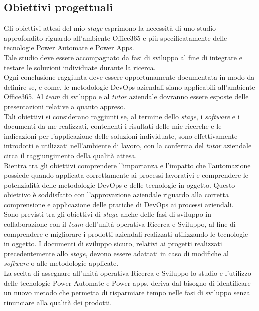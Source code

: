 \subsection{Obiettivi progettuali}
Gli obiettivi attesi del mio \emph{stage} esprimono la necessità di uno studio approfondito riguardo all'ambiente Office365 e più specificatamente delle tecnologie Power Automate e Power Apps.\\
Tale studio deve essere accompagnato da fasi di sviluppo al fine di integrare e testare le soluzioni individuate durante la ricerca.\\
Ogni conclusione raggiunta deve essere opportunamente documentata in modo da definire se, e come, le metodologie \gls{DevOps} aziendali siano applicabili all'ambiente Office365. Al \emph{team} di sviluppo e al \emph{tutor} aziendale dovranno essere esposte delle presentazioni relative a quanto appreso.\\
Tali obiettivi si considerano raggiunti se, al termine dello \emph{stage}, i \emph{software} e i documenti da me realizzati, contenenti i risultati delle mie ricerche e le indicazioni per l'applicazione delle soluzioni individuate, sono effettivamente introdotti e utilizzati nell'ambiente di lavoro, con la conferma del \emph{tutor} aziendale circa il raggiungimento della qualità attesa.\\
Rientra tra gli obiettivi comprendere l'importanza e l'impatto che l'automazione possiede quando applicata correttamente ai processi lavorativi e comprendere le potenzialità delle metodologie \gls{DevOps} e delle tecnologie in oggetto. Questo obiettivo è soddisfatto con l'approvazione aziendale riguardo alla corretta comprensione e applicazione delle pratiche di \gls{DevOps} ai processi aziendali.\\
Sono previsti tra gli obiettivi di \emph{stage} anche delle fasi di sviluppo in collaborazione con il \emph{team} dell'unità operativa Ricerca e Sviluppo, al fine di comprendere e migliorare i prodotti aziendali realizzati utilizzando le tecnologie in oggetto. I documenti di sviluppo sicuro, relativi ai progetti realizzati precedentemente allo \emph{stage}, devono essere adattati in caso di modifiche al \emph{software} o alle metodologie applicate.\\
La scelta di assegnare all'unità operativa Ricerca e Sviluppo lo studio e l'utilizzo delle tecnologie Power Automate e Power apps, deriva dal bisogno di identificare un nuovo metodo che permetta di risparmiare tempo nelle fasi di sviluppo senza rinunciare alla qualità dei prodotti.\\
